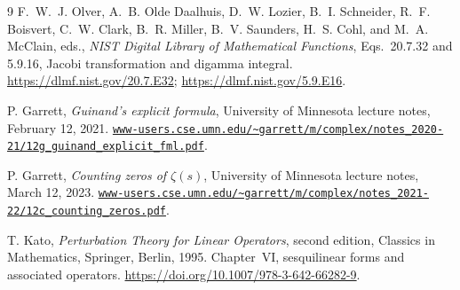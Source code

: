 \documentclass[11pt,a4paper]{article}
\numberwithin{equation}{section}
\theoremstyle{definition}
\theoremstyle{remark}
\begin{document}
\begingroup
\small
\raggedright
{}
\begin{thebibliography}{9}
\setlength{\itemsep}{3pt}
F.~W.~J. Olver, A.~B. Olde Daalhuis, D.~W. Lozier, B.~I. Schneider,
R.~F. Boisvert, C.~W. Clark, B.~R. Miller, B.~V. Saunders, H.~S. Cohl,
and M.~A. McClain, eds.,
\emph{NIST Digital Library of Mathematical Functions},
Eqs.~20.7.32 and 5.9.16, Jacobi transformation and digamma integral.
\url{https://dlmf.nist.gov/20.7.E32};
\url{https://dlmf.nist.gov/5.9.E16}.

P. Garrett, \emph{Guinand's explicit formula},
University of Minnesota lecture notes, February 12, 2021.
\newline
\href{https://www-users.cse.umn.edu/~garrett/m/complex/notes_2020-21/12g_guinand_explicit_fml.pdf}{\nolinkurl{www-users.cse.umn.edu/~garrett/m/complex/notes_2020-21/12g_guinand_explicit_fml.pdf}}.

P. Garrett, \emph{Counting zeros of $\zeta(s)$},
University of Minnesota lecture notes, March 12, 2023.
\newline
\href{https://www-users.cse.umn.edu/~garrett/m/complex/notes_2021-22/12c_counting_zeros.pdf}{\nolinkurl{www-users.cse.umn.edu/~garrett/m/complex/notes_2021-22/12c_counting_zeros.pdf}}.

T. Kato, \emph{Perturbation Theory for Linear Operators},
second edition, Classics in Mathematics, Springer, Berlin, 1995.
Chapter~VI, sesquilinear forms and associated operators.
\url{https://doi.org/10.1007/978-3-642-66282-9}.
\end{thebibliography}
\endgroup
\end{document}
